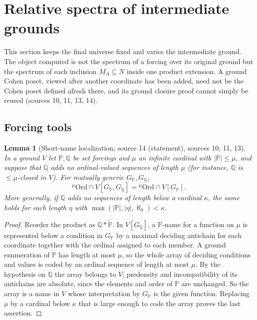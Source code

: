 \documentclass[11pt,letterpaper]{article}
\numberwithin{equation}{section}
\newtheorem{lemma}[lemma]{Lemma}
\theoremstyle{definition}
\theoremstyle{remark}
\newcommand{\Ord}{\mathrm{Ord}}
\newcommand{\abs}[1]{\lvert#1\rvert}
\begin{document}
\section{Relative spectra of intermediate grounds}\label{univ:gs:sec:relative}

This section keeps the final universe fixed and varies the intermediate ground. The
object computed is not the spectrum of a forcing over its original ground but the
spectrum of each inclusion $M_A\subseteq N$ inside one product extension. A ground
Cohen poset, viewed after another coordinate has been added, need not be the Cohen
poset defined afresh there, and its ground closure proof cannot simply be reused
(sources 10, 11, 13, 14).

\subsection{Forcing tools}

\begin{lemma}[Short-name localization; source 14 (statement), sources 10, 11, 13]\label{univ:gs:lem:localization}
In a ground $V$ let $\mathbb P,\mathbb Q$ be set forcings and $\mu$ an infinite
cardinal with $\abs{\mathbb P}\le\mu$, and suppose that $\mathbb Q$ adds no
ordinal-valued sequences of length $\mu$ (for instance, $\mathbb Q$ is
$\le\mu$-closed in $V$). For mutually generic $G_{\mathbb P},G_{\mathbb Q}$,
\[
 {}^\mu\Ord\cap V[G_{\mathbb P},G_{\mathbb Q}]={}^\mu\Ord\cap V[G_{\mathbb P}].
\]
More generally, if $\mathbb Q$ adds no sequences of length below a cardinal
$\kappa$, the same holds for each length $\eta$ with
$\max(\abs{\mathbb P},\abs\eta,\aleph_0)<\kappa$.
\end{lemma}
\begin{proof}
Reorder the product as $\mathbb Q*\check{\mathbb P}$. In $V[G_{\mathbb Q}]$, a
$\mathbb P$-name for a function on $\mu$ is represented below a condition in
$G_{\mathbb P}$ by a maximal deciding antichain for each coordinate together with the
ordinal assigned to each member. A ground enumeration of $\mathbb P$ has length at most
$\mu$, so the whole array of deciding conditions and values is coded by an ordinal
sequence of length at most $\mu$. By the hypothesis on $\mathbb Q$ the array belongs
to $V$; predensity and incompatibility of its antichains are absolute, since the
elements and order of $\mathbb P$ are unchanged. So the array is a name in $V$ whose
interpretation by $G_{\mathbb P}$ is the given function. Replacing $\mu$ by a cardinal
below $\kappa$ that is large enough to code the array proves the last assertion.
\end{proof}
\end{document}
